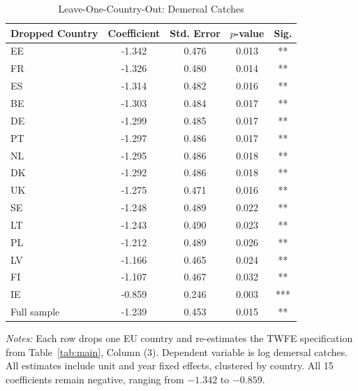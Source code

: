 \begin{table}[htbp]
\centering
\caption{Leave-One-Country-Out: Demersal Catches}
\label{tab:loo}
\begin{tabular}{lcccc}
\hline\hline
Dropped Country & Coefficient & Std. Error & $p$-value & Sig. \\
\hline
EE & -1.342 & 0.476 & 0.013 & ** \\
FR & -1.326 & 0.480 & 0.014 & ** \\
ES & -1.314 & 0.482 & 0.016 & ** \\
BE & -1.303 & 0.484 & 0.017 & ** \\
DE & -1.299 & 0.485 & 0.017 & ** \\
PT & -1.297 & 0.486 & 0.017 & ** \\
NL & -1.295 & 0.486 & 0.018 & ** \\
DK & -1.292 & 0.486 & 0.018 & ** \\
UK & -1.275 & 0.471 & 0.016 & ** \\
SE & -1.248 & 0.489 & 0.022 & ** \\
LT & -1.243 & 0.490 & 0.023 & ** \\
PL & -1.212 & 0.489 & 0.026 & ** \\
LV & -1.166 & 0.465 & 0.024 & ** \\
FI & -1.107 & 0.467 & 0.032 & ** \\
IE & -0.859 & 0.246 & 0.003 & *** \\
\hline
Full sample & -1.239 & 0.453 & 0.015 & ** \\
\hline\hline
\end{tabular}
\begin{tablenotes}[flushleft]
\small
\item \textit{Notes:} Each row drops one EU country and re-estimates the TWFE specification from Table~\ref{tab:main}, Column (3). Dependent variable is log demersal catches. All estimates include unit and year fixed effects, clustered by country. All 15 coefficients remain negative, ranging from $-1.342$ to $-0.859$.
\end{tablenotes}
\end{table}
